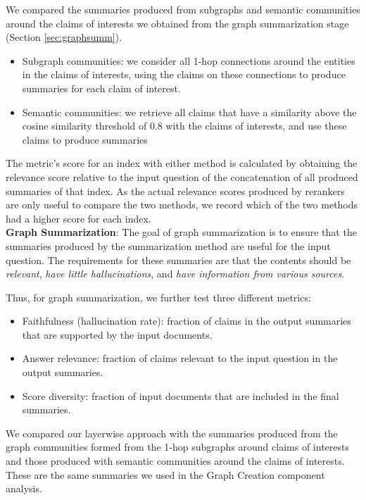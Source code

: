\documentclass[11pt]{article}
\theoremstyle{definition}
\begin{document}
We compared the summaries produced from subgraphs and semantic communities around the claims of interests we obtained from the graph summarization stage (Section \ref{sec:graphsumm}). 

\begin{itemize}[noitemsep, leftmargin=*]
    \item Subgraph communities: we consider all 1-hop connections around the entities in the claims of interests, using the claims on these connections to produce summaries for each claim of interest.
    \item Semantic communities: we retrieve all claims that have a similarity above the cosine similarity threshold of 0.8 with the claims of interests, and use these claims to produce summaries
\end{itemize}

The metric's score for an index with either method is calculated by obtaining the relevance score relative to the input question of the concatenation of all produced summaries of that index. As the actual relevance scores produced by rerankers are only useful to compare the two methods, we record which of the two methods had a higher score for each index.
\\

\noindent
\textbf{Graph Summarization}: The goal of graph summarization is to ensure that the summaries produced by the summarization method are useful for the input question. The requirements for these summaries are that the contents should be \textit{relevant}, \textit{have little hallucinations}, and \textit{have information from various sources}. 

Thus, for graph summarization, we further test three different metrics: 
\begin{itemize}[noitemsep,leftmargin=*]
    \item Faithfulness (hallucination rate): fraction of claims in the output summaries that are supported by the input documents.
    \item Answer relevance: fraction of claims relevant to the input question in the output summaries.
    \item Score diversity: fraction of input documents that are included in the final summaries.
\end{itemize} 

We compared our layerwise approach with the summaries produced from the graph communities formed from the 1-hop subgraphs around claims of interests and those produced with semantic communities around the claims of interests. These are the same summaries we used in the Graph Creation component analysis.
\end{document}
